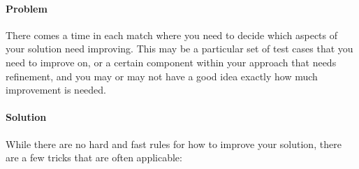 \hypertarget{problem-4}{%
\paragraph{Problem}\label{problem-4}}

There comes a time in each match where you need to decide which aspects
of your solution need improving. This may be a particular set of test
cases that you need to improve on, or a certain component within your
approach that needs refinement, and you may or may not have a good idea
exactly how much improvement is needed.

\hypertarget{solution-4}{%
\paragraph{Solution}\label{solution-4}}

While there are no hard and fast rules for how to improve your solution,
there are a few tricks that are often applicable:

